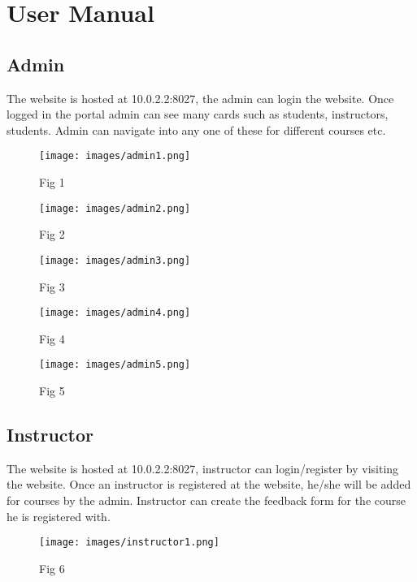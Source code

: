 \documentclass{article}
\begin{document}
\section{User Manual}
\subsection{Admin}
The website is hosted at 10.0.2.2:8027, the admin can login the website. Once logged in the portal admin can see many cards such as students, instructors, students. Admin can navigate into any one of these for different courses etc.\\

\begin{figure}[ht!]
\centering
\texttt{[image: images/admin1.png]}
\caption{Fig 1 \label{overflow}}
\end{figure}

\begin{figure}[ht!]
\centering
\texttt{[image: images/admin2.png]}
\caption{Fig 2 \label{overflow}}
\end{figure}

\begin{figure}[ht!]
\centering
\texttt{[image: images/admin3.png]}
\caption{Fig 3 \label{overflow}}
\end{figure}

\begin{figure}[ht!]
\centering
\texttt{[image: images/admin4.png]}
\caption{Fig 4 \label{overflow}}
\end{figure}

\begin{figure}[ht!]
\centering
\texttt{[image: images/admin5.png]}
\caption{Fig 5 \label{overflow}}
\end{figure}

\subsection{Instructor}
The website is hosted at 10.0.2.2:8027, instructor can login/register by visiting the website.
Once an instructor is registered at the website, he/she will be added for courses by the admin.
Instructor can create the feedback form for the course he is registered with.

\begin{figure}[ht!]
\centering
\texttt{[image: images/instructor1.png]}
\caption{Fig 6 \label{overflow}}
\end{figure}
\end{document}
